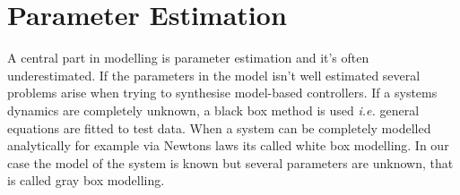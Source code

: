 \chapter{Parameter Estimation} \label{cha:parameterEstimation}
A central part in modelling is parameter estimation and it's often underestimated. If the parameters in the model isn't well estimated several problems arise when trying to synthesise model-based controllers. If a systems dynamics are completely unknown, a black box method is used \textit{i.e.} general equations are fitted to test data. When a system can be completely modelled analytically for example via Newtons laws its called white box modelling. In our case the model of the system is known but several parameters are unknown, that is called gray box modelling. 


